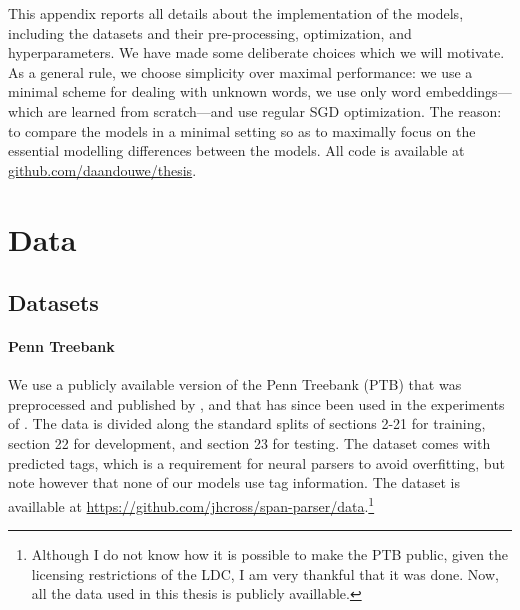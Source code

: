 % 

This appendix reports all details about the implementation of the models, including the datasets and their pre-processing, optimization, and hyperparameters. We have made some deliberate choices which we will motivate. As a general rule, we choose simplicity over maximal performance: we use a minimal scheme for dealing with unknown words, we use only word embeddings---which are learned from scratch---and use regular SGD optimization. The reason: to compare the models in a minimal setting so as to maximally focus on the essential modelling differences between the models. All code is available at \url{github.com/daandouwe/thesis}.

\section{Data}

  \subsection{Datasets}

    \paragraph{Penn Treebank}
    We use a publicly available version of the Penn Treebank (PTB) that was preprocessed and published by \citet{cross2016span}, and that has since been used in the experiments of \citet{stern2017minimal,kitaev2018attentive}. The data is divided along the standard splits of sections 2-21 for training, section 22 for development, and section 23 for testing. The dataset comes with predicted tags, which is a requirement for neural parsers to avoid overfitting, but note however that none of our models use tag information. The dataset is availlable at \url{https://github.com/jhcross/span-parser/data}.\footnote{Although I do not know how it is possible to make the PTB public, given the licensing restrictions of the LDC, I am very thankful that it was done. Now, all the data used in this thesis is publicly availlable.}

